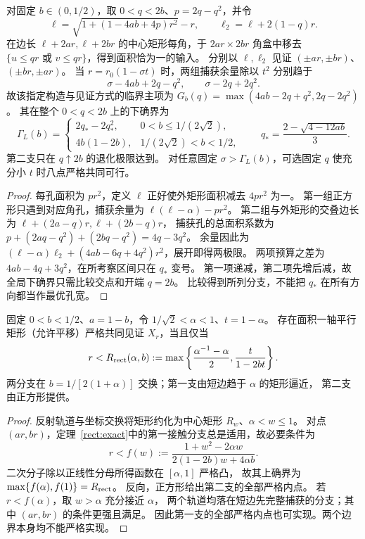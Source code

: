 \begin{proposition}[一般方向的角孔类及其分支]\label{cs:L}
对固定 $b\in(0,1/2)$，取 $0<q<2b$、$p=2q-q^2$，并令
\[
 \ell=\sqrt{1+(1-4ab+4p)r^2}-r,\qquad \ell_2=\ell+2(1-q)r.
\]
在边长 $\ell+2ar,\ell+2br$ 的中心矩形每角，于 $2ar\times2br$ 角盒中移去
$\{u\le qr\text{ 或 }v\le qr\}$，得到面积恰为一的输入。
分别以 $\ell,\ell_2$ 见证 $(\pm ar,\pm br)$、$(\pm br,\pm ar)$。
当 $r=r_0(1-\sigma t)$ 时，两组捕获余量除以 $t^2$ 分别趋于
\[
 \sigma-4ab+2q-q^2,\qquad \sigma-2q+2q^2.
\]
故该指定构造与见证方式的临界主项为
$G_b(q)=\max(4ab-2q+q^2,2q-2q^2)$。
其在整个 $0<q<2b$ 上的下确界为
\[
 \Gamma_L(b)=
 \begin{cases}
 2q_*-2q_*^2,&0<b\le1/(2\sqrt2),\\
 4b(1-2b),&1/(2\sqrt2)<b<1/2,
 \end{cases}
 \qquad q_*=\frac{2-\sqrt{4-12ab}}{3}.
\]
第二支只在 $q\uparrow2b$ 的退化极限达到。
对任意固定 $\sigma>\Gamma_L(b)$，可选固定 $q$ 使充分小 $t$ 时八点严格共同可行。
\end{proposition}
\begin{proof}
每孔面积为 $pr^2$，定义 $\ell$ 正好使外矩形面积减去 $4pr^2$ 为一。
第一组正方形只遇到对应角孔，捕获余量为 $\ell(\ell-\alpha)-pr^2$。
第二组与外矩形的交叠边长为 $\ell+(2a-q)r,\ell+(2b-q)r$，
捕获孔的总面积系数为 $p+(2aq-q^2)+(2bq-q^2)=4q-3q^2$。
余量因此为 $(\ell-\alpha)\ell_2+(4ab-6q+4q^2)r^2$，展开即得两极限。
两项预算之差为 $4ab-4q+3q^2$，在所考察区间只在 $q_*$ 变号。
第一项递减，第二项先增后减，故全局下确界只需比较交点和开端 $q=2b$。
比较得到所列分支，不能把 $q_*$ 在所有方向都当作最优孔宽。
\end{proof}

\begin{proposition}[一般方向的矩形类半径]\label{cs:rect}
固定 $0<b<1/2$、$a=1-b$，令 $1/\sqrt2<\alpha<1$、$t=1-\alpha$。
存在面积一轴平行矩形（允许平移）严格共同见证 $X_r$，当且仅当
\[
 r<R_{\rm rect}(\alpha,b):=
 \max\left\{\frac{\alpha^{-1}-\alpha}{2},\frac{t}{1-2bt}\right\}.
\]
两分支在 $b=1/[2(1+\alpha)]$ 交换；第一支由短边趋于 $\alpha$ 的矩形逼近，
第二支由正方形提供。
\end{proposition}
\begin{proof}
反射轨道与坐标交换将矩形约化为中心矩形 $R_w$、$\alpha<w\le1$。
对点 $(ar,br)$，定理~\ref{rect:exact}中的第一接触分支总是适用，故必要条件为
\[
 r<f(w):=\frac{1+w^2-2\alpha w}{2(1-2b)w+4\alpha b}.
\]
二次分子除以正线性分母所得函数在 $[\alpha,1]$ 严格凸，
故其上确界为 $\max\{f(\alpha),f(1)\}=R_{\rm rect}$。
反向，正方形给出第二支的全部严格内点。
若 $r<f(\alpha)$，取 $w>\alpha$ 充分接近 $\alpha$，
两个轨道均落在短边先完整捕获的分支；其中 $(ar,br)$ 的条件更强且满足。
因此第一支的全部严格内点也可实现。两个边界本身均不能严格实现。
\end{proof}

